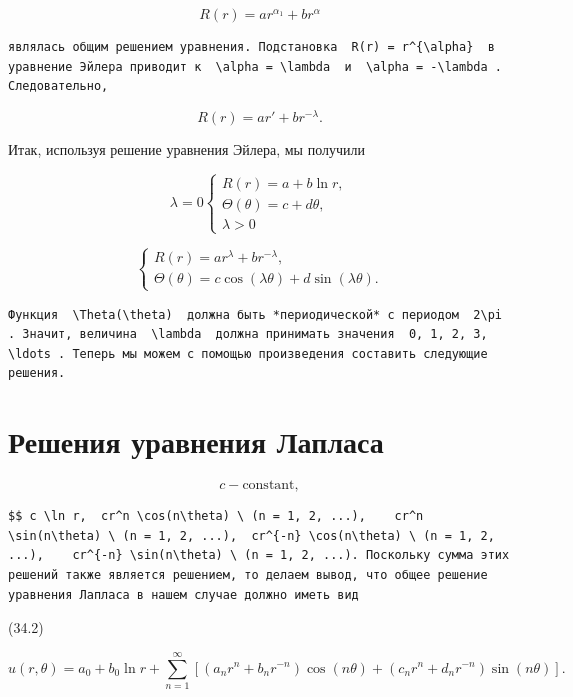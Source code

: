 \documentclass[
  ukrainian,
]{article}
\begin{document}
\[
R(r) = ar^{\alpha_1} + br^{\alpha}
\]

\begin{verbatim}
являлась общим решением уравнения. Подстановка  R(r) = r^{\alpha}  в уравнение Эйлера приводит к  \alpha = \lambda  и  \alpha = -\lambda . Следовательно,
\end{verbatim}

\[
R(r) = ar' + br^{-\lambda}.
\]

Итак, используя решение уравнения Эйлера, мы получили

\[
\lambda = 0 \begin{cases} R(r) = a + b \ln r, \\ \Theta(\theta) = c + d\theta, \\ \lambda > 0 \end{cases}
\]

\[
\begin{cases} R(r) = ar^{\lambda} + br^{-\lambda}, \\ \Theta(\theta) = c \cos(\lambda \theta) + d \sin(\lambda \theta). \end{cases}
\]

\begin{verbatim}
Функция  \Theta(\theta)  должна быть *периодической* с периодом  2\pi . Значит, величина  \lambda  должна принимать значения  0, 1, 2, 3, \ldots . Теперь мы можем с помощью произведения составить следующие решения.
\end{verbatim}

\section{Решения уравнения
Лапласа}\label{ux440ux435ux448ux435ux43dux438ux44f-ux443ux440ux430ux432ux43dux435ux43dux438ux44f-ux43bux430ux43fux43bux430ux441ux430}

\[
c - \text{constant},
\]

\begin{verbatim}
$$ c \ln r,  cr^n \cos(n\theta) \ (n = 1, 2, ...),    cr^n \sin(n\theta) \ (n = 1, 2, ...),  cr^{-n} \cos(n\theta) \ (n = 1, 2, ...),    cr^{-n} \sin(n\theta) \ (n = 1, 2, ...). Поскольку сумма этих решений также является решением, то делаем вывод, что общее решение уравнения Лапласа в нашем случае должно иметь вид
\end{verbatim}

(34.2)

\[
u(r, \theta) = a_0 + b_0 \ln r + \sum_{n=1}^{\infty} \left[ (a_n r^n + b_n r^{-n}) \cos(n\theta) + (c_n r^n + d_n r^{-n}) \sin(n\theta) \right].
\]
\end{document}
